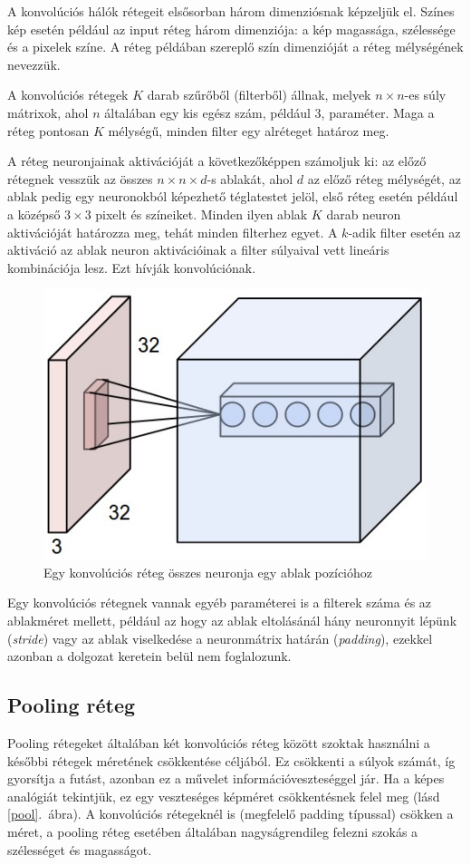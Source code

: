 A konvolúciós hálók rétegeit elsősorban három dimenziósnak képzeljük el. Színes kép esetén például az input réteg három dimenziója: a kép magassága, szélessége és a pixelek színe. A réteg példában szereplő szín dimenzióját a réteg mélységének nevezzük.

A konvolúciós rétegek $K$ darab szűrőből (filterből) állnak, melyek $n\times n$-es súly mátrixok, ahol $n$ általában egy kis egész szám, például 3, paraméter. Maga a réteg pontosan $K$ mélységű, minden filter egy alréteget határoz meg.

A réteg neuronjainak aktivációját a következőképpen számoljuk ki: az előző rétegnek vesszük az összes $n\times n\times d$-s ablakát, ahol $d$ az előző réteg mélységét, az ablak pedig egy neuronokból képezhető téglatestet jelöl, első réteg esetén például a középső $3\times3$ pixelt és színeiket. Minden ilyen ablak $K$ darab neuron aktivációját határozza meg, tehát minden filterhez egyet. A $k$-adik filter esetén az aktiváció az ablak neuron aktivációinak a filter súlyaival vett lineáris kombinációja lesz. Ezt hívják konvolúciónak.

\begin{figure}[h!]
\begin{center}
  \includegraphics[width=0.4\linewidth]{depthcol.jpg}
  \caption{Egy konvolúciós réteg összes neuronja egy ablak pozícióhoz}
\end{center}
\end{figure}

Egy konvolúciós rétegnek vannak egyéb paraméterei is a filterek száma és az ablakméret mellett, például az hogy az ablak eltolásánál hány neuronnyit lépünk (\emph{stride}) vagy az ablak viselkedése a neuronmátrix határán (\emph{padding}), ezekkel azonban a dolgozat keretein belül nem foglalozunk.

\subsection{Pooling réteg}

Pooling rétegeket általában két konvolúciós réteg között szoktak használni a későbbi rétegek méretének csökkentése céljából. Ez csökkenti a súlyok számát, íg gyorsítja a futást, azonban ez a művelet információveszteséggel jár. Ha a képes analógiát tekintjük, ez egy veszteséges képméret csökkentésnek felel meg (lásd \ref{pool}.~ábra). A konvolúciós rétegeknél is (megfelelő padding típussal) csökken a méret, a pooling réteg esetében általában nagyságrendileg felezni szokás a szélességet és magasságot.


